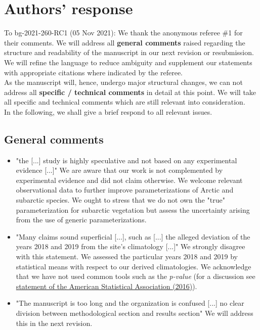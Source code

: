 \documentclass{scrartcl}
\begin{document}
\section*{Authors' response}
To bg-2021-260-RC1 (05 Nov 2021):
We thank the anonymous referee \#1 for their comments.
We will address all \textbf{general comments} raised regarding the structure and readability of the manuscript in our next revision or resubmission. We will refine the language to reduce ambiguity and supplement our statements with appropriate citations where indicated by the referee.\\
As the manuscript will, hence, undergo major structural changes, we can not address all \textbf{specific / technical comments} in detail at this point. We will take all specific and technical comments which are still relevant into consideration.\\
In the following, we shall give a brief respond to all relevant issues.

\subsection*{General comments} 
\begin{itemize}
    
    \item {\color{blue} "the [...] study is highly speculative and not based on any experimental evidence [...]"} We are aware that our work is not complemented by experimental evidence and did not claim otherwise. We welcome relevant observational data to further improve parameterizations of Arctic and subarctic species. We ought to stress that we do not own the "true" parameterization for subarctic vegetation but assess the uncertainty arising from the use of generic parameterizations.
    \item {\color{blue} "Many claims sound superficial [...], such as [...] the alleged deviation of the years 2018 and 2019 from the site's climatology [...]"} We strongly disagree with this statement. We assessed the particular years 2018 and 2019 by statistical means with respect to our derived climatologies. We acknowledge that we have not used common tools such as the \emph{p-value} (for a discussion see \href{https://doi.org/10.1080/00031305.2016.1154108}{statement of the American Statistical Association (2016)}).
    \item {\color{blue} "The manuscript is too long and the organization is confused  [...] no clear division between methodological section and results section"} We will address this in the next revision.

\end{itemize}
\end{document}
